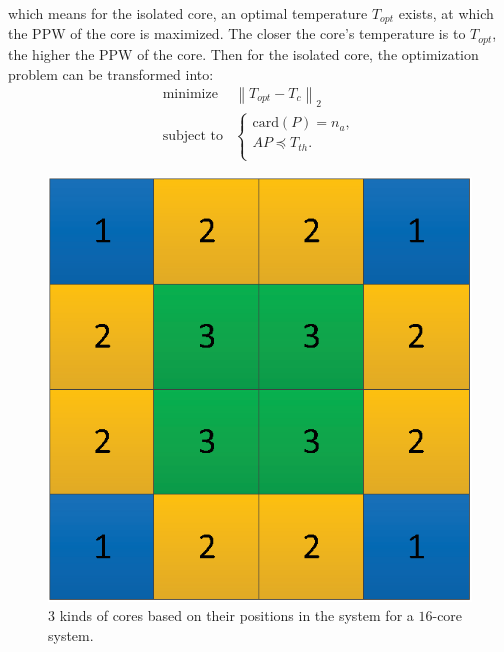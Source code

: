 

which means for the isolated core, an optimal temperature $T_{opt}$ exists, at which the PPW of the core is maximized. 
The closer the core's temperature is to $T_{opt}$, the higher the PPW of the core. Then for the isolated core, the optimization problem can be transformed into:
\begin{equation}\label{eq:ppw_t_opt}
\begin{split}
\text{minimize } &  \left \| {T}_{opt}-T_{c} \right \|_{2}\\
\text{subject to} &\left\{
\begin{array}{lr}
\text{card}(P) = n_{a},\\
{A}P \preceq {T}_{th}.\\
\end{array}
\right.
\end{split}
\end{equation}



\begin{figure}
\centering
\includegraphics[width=0.46\linewidth]{fig/unique_position.eps}
\caption{$3$ kinds of cores based on their positions in the system for a $16$-core system.}
\label{fig:unique_position}
\end{figure}

